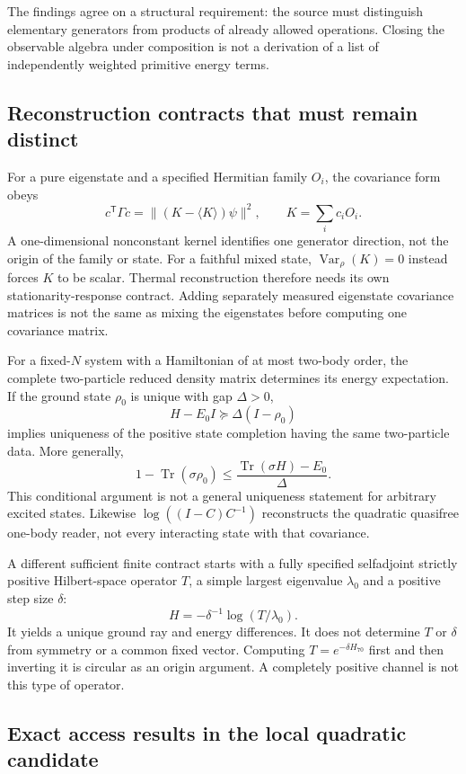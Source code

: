 The findings agree on a structural requirement: the source must distinguish
elementary generators from products of already allowed operations. Closing
the observable algebra under composition is not a derivation of a list of
independently weighted primitive energy terms.

\subsection{Reconstruction contracts that must remain distinct}

For a pure eigenstate and a specified Hermitian family $O_i$, the covariance
form obeys
\[
 c^{\mathsf T}\Gamma c
 =\|(K-\langle K\rangle)\psi\|^2,\qquad K=\sum_i c_iO_i.
\]
A one-dimensional nonconstant kernel identifies one generator direction,
not the origin of the family or state. For a faithful mixed state,
$\operatorname{Var}_\rho(K)=0$ instead forces $K$ to be scalar. Thermal
reconstruction therefore needs its own stationarity-response contract.
Adding separately measured eigenstate covariance matrices is not the same
as mixing the eigenstates before computing one covariance matrix.

For a fixed-$N$ system with a Hamiltonian of at most two-body order, the
complete two-particle reduced density matrix determines its energy
expectation. If the ground state $\rho_0$ is unique with gap $\Delta>0$,
\[
 H-E_0I\succeq\Delta(I-\rho_0)
\]
implies uniqueness of the positive state completion having the same
two-particle data. More generally,
\[
 1-\operatorname{Tr}(\sigma\rho_0)
 \leq\frac{\operatorname{Tr}(\sigma H)-E_0}{\Delta}.
\]
This conditional argument is not a general uniqueness statement for
arbitrary excited states. Likewise
$\log((I-C)C^{-1})$ reconstructs the quadratic quasifree one-body reader,
not every interacting state with that covariance.

A different sufficient finite contract starts with a fully specified
selfadjoint strictly positive Hilbert-space operator $T$, a simple largest
eigenvalue $\lambda_0$ and a positive step size $\delta$:
\[
 H=-\delta^{-1}\log(T/\lambda_0).
\]
It yields a unique ground ray and energy differences. It does not determine
$T$ or $\delta$ from symmetry or a common fixed vector. Computing
$T=e^{-\delta H_{70}}$ first and then inverting it is circular as an origin
argument. A completely positive channel is not this type of operator.

\subsection{Exact access results in the local quadratic candidate}

